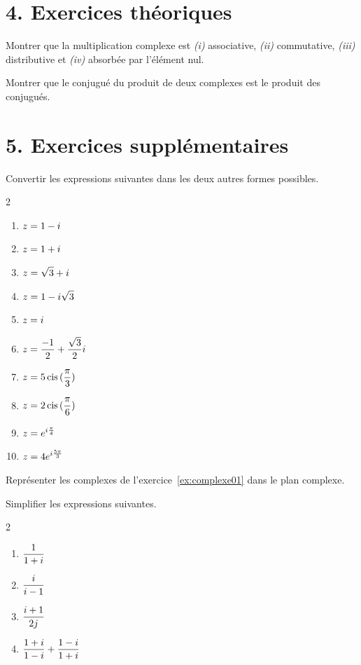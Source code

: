 \section*{4. Exercices théoriques}
\begin{exercise}
    Montrer que la multiplication complexe est \emph{(i)} associative, \emph{(ii)} commutative, \emph{(iii)} distributive et \emph{(iv)} absorbée par l'élément nul.
\end{exercise}

\begin{exercise}
    Montrer que le conjugué du produit de deux complexes est le produit des conjugués.
\end{exercise}

\section*{5. Exercices supplémentaires}

\begin{exercise}
    \label{ex:complexe01}
    Convertir les expressions suivantes dans les deux autres formes possibles.
    \begin{multicols}{2}
    \begin{enumerate}[label=(\alph*)]
        \item $\displaystyle z = 1 - i$
        \item $\displaystyle z = 1 + i$
        \item $\displaystyle z = \sqrt{3} + i$
        \item $\displaystyle z = 1 - i\sqrt3$
        \item $\displaystyle z = i$
        \item $\displaystyle z = \frac{-1}2 + \frac{\sqrt3}2i$
        \item $\displaystyle z = 5 \operatorname{cis}{(\frac\pi3)}$
        \item $\displaystyle z = 2 \operatorname{cis}{(\frac\pi6)}$
        \item $\displaystyle z = e^{i\frac\pi4}$
        \item $\displaystyle z = 4e^{i\frac{5\pi}3}$
    \end{enumerate}
    \end{multicols}
\end{exercise}

\begin{exercise}
    Représenter les complexes de l'exercice~\ref{ex:complexe01} dans le plan complexe.
\end{exercise}

\begin{exercise}
    Simplifier les expressions suivantes.
    \begin{multicols}{2}
    \begin{enumerate}[label=(\alph*)]
        \item $\displaystyle \frac1{1+i}$
        \item $\displaystyle \frac{i}{i-1}$
        \item $\displaystyle \frac{i+1}{2j}$
        \item $\displaystyle \frac{1+i}{1-i} + \frac{1-i}{1+i}$
    \end{enumerate}
    \end{multicols}
\end{exercise}

